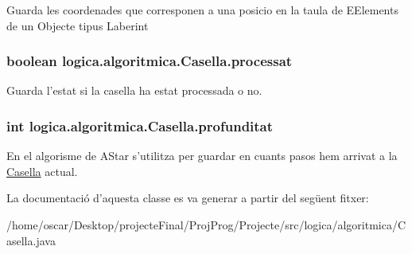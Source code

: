 Guarda les coordenades que corresponen a una posicio en la taula de E\+Elements de un Objecte tipus Laberint \hypertarget{classlogica_1_1algoritmica_1_1_casella_aa4c76bca181afa4cfa68b7150365305d}{
\subsubsection[{processat}]{\setlength{\rightskip}{0pt plus 5cm}boolean logica.\+algoritmica.\+Casella.\+processat\hspace{0.3cm}{\ttfamily [private]}}}\label{classlogica_1_1algoritmica_1_1_casella_aa4c76bca181afa4cfa68b7150365305d}
Guarda l'estat si la casella ha estat processada o no. \hypertarget{classlogica_1_1algoritmica_1_1_casella_aa1e2c28f03ba466a988117daab70ce57}{
\subsubsection[{profunditat}]{\setlength{\rightskip}{0pt plus 5cm}int logica.\+algoritmica.\+Casella.\+profunditat\hspace{0.3cm}{\ttfamily [private]}}}\label{classlogica_1_1algoritmica_1_1_casella_aa1e2c28f03ba466a988117daab70ce57}
En el algorisme de A\+Star s'utilitza per guardar en cuants pasos hem arrivat a la \hyperlink{classlogica_1_1algoritmica_1_1_casella}{Casella} actual. 

La documentació d'aquesta classe es va generar a partir del següent fitxer\+:\begin{DoxyCompactItemize}
\item 
/home/oscar/\+Desktop/projecte\+Final/\+Proj\+Prog/\+Projecte/src/logica/algoritmica/Casella.\+java\end{DoxyCompactItemize}
